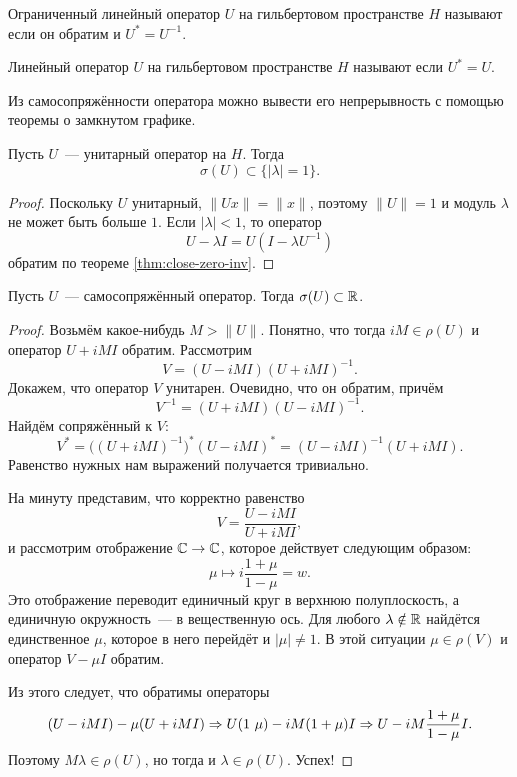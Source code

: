 \documentclass{notes}
\begin{document}
	\begin{de}
		Ограниченный линейный оператор $U$ на гильбертовом пространстве $H$ называют  если он обратим и $U^{*} = U^{-1}$. 
	\end{de}

	\begin{de}
		Линейный оператор $U$ на гильбертовом пространстве $H$ называют  если $U^{*} = U$. 
	\end{de}

	\begin{rem}
		Из самосопряжённости оператора можно вывести его непрерывность с помощью теоремы о замкнутом графике.
	\end{rem}

	\begin{st}
		Пусть $U$~--- унитарный оператор на $H$. Тогда
		\[
			\sigma(U) \subset \{|\lambda| = 1\}.
		\]
		\begin{proof}
			Поскольку $U$ унитарный, $\|Ux\| = \|x\|$, поэтому $\|U\| = 1$ и модуль $\lambda$ не может быть больше $1$. Если $|\lambda| < 1$, то оператор
			\[
				U - \lambda I = U \left(I - \lambda U^{-1}\right)
			\]
			обратим по теореме \ref{thm:close-zero-inv}. 
		\end{proof}
	\end{st}

	\begin{thm}
		Пусть $U$~--- самосопряжённый оператор. Тогда $\sigma(U) \subset \mathbb{R}$.
		\begin{proof}
			Возьмём какое-нибудь $M > \|U\|$. Понятно, что тогда $iM \in \rho(U)$ и оператор $U + iMI$ обратим. Рассмотрим
			\[
				V = (U - iMI)(U + iMI)^{-1}.
			\]
			Докажем, что оператор $V$ унитарен. Очевидно, что он обратим, причём
			\[
				V^{-1} = (U + iMI)(U - iMI)^{-1}.
			\]
			Найдём сопряжённый к $V$:
			\[
				V^* = \big((U + iMI)^{-1}\big)^* (U - iMI)^* = (U - iMI)^{-1} (U + iMI).
			\]
			Равенство нужных нам выражений получается тривиально.

			На минуту представим, что корректно равенство
			\[
				V = \dfrac{U - iMI}{U + iMI},
			\]
			и рассмотрим отображение $\mathbb{C} \to \mathbb{C}$, которое действует следующим образом:
			\[
				\mu \mapsto i \dfrac{1 + \mu}{1 - \mu} = w.
			\]
			Это отображение переводит единичный круг в верхнюю полуплоскость, а единичную окружность~--- в вещественную ось. Для любого $\lambda \notin \mathbb{R}$ найдётся единственное $\mu$, которое в него перейдёт и $|\mu| \neq 1$. В этой ситуации $\mu \in \rho(V)$ и оператор $V - \mu I$ обратим.

			Из этого следует, что обратимы операторы
			\[
				(U - iMI) - \mu(U + iMI) \Rightarrow U(1 \ \mu) - iM (1 + \mu) I \Rightarrow U - iM \dfrac{1 + \mu}{1 - \mu} I.
			\]
			Поэтому $M\lambda \in \rho(U)$, но тогда и $\lambda \in \rho(U)$. Успех!
		\end{proof}
	\end{thm}
\end{document}
